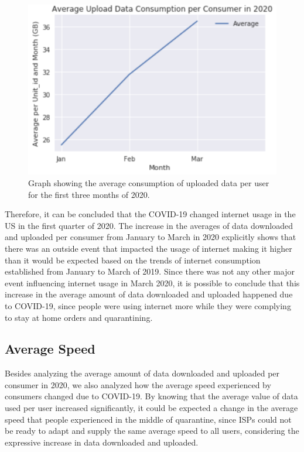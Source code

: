 \documentclass[conference,10pt]{IEEEtran}
\begin{document}
\begin{figure}
\centering
\includegraphics[width=1.0\linewidth]{figs/upload2020.PNG}
\caption{Graph showing the average consumption of uploaded data per user for the first three months of 2020.}
\label{fig:upload2020}
\end{figure}

Therefore, it can be concluded that the COVID-19 changed internet usage in the US in the first quarter of 2020. The increase in the averages of data downloaded and uploaded per consumer from January to March in 2020 explicitly shows that there was an outside event that impacted the usage of internet making it higher than it would be expected based on the trends of internet consumption established from January to March of 2019. Since there was not any other major event influencing internet usage in March 2020, it is possible to conclude that this increase in the average amount of data downloaded and uploaded happened due to COVID-19, since people were using internet more while they were complying to stay at home orders and quarantining.

\subsection{Average Speed}
\label{sec:average-speed}
Besides analyzing the average amount of data downloaded and uploaded per consumer in 2020, we also analyzed how the average speed experienced by consumers changed due to COVID-19. By knowing that the average value of data used per user increased significantly, it could be expected a change in the average speed that people experienced in the middle of quarantine, since ISPs could not be ready to adapt and supply the same average speed to all users, considering the expressive increase in data downloaded and uploaded.
\end{document}

